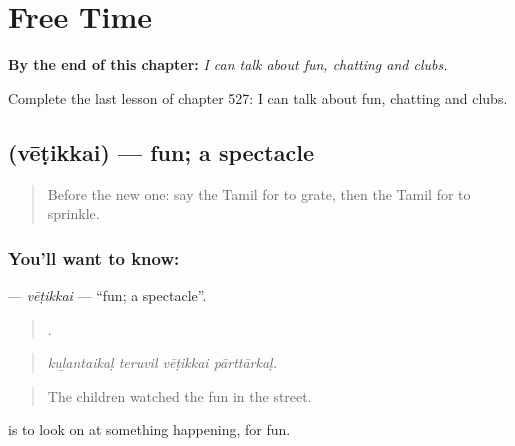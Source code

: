 
\chapter{Free Time}
\label{ch:ta-free-time}

\begin{chapteropening}
\textbf{By the end of this chapter:} \emph{I can talk about fun, chatting and clubs.}

Complete the last lesson of chapter 527: I can talk about fun, chatting and clubs.
\end{chapteropening}

\section[\texorpdfstring{\ta{வேடிக்கை} (vēṭikkai)}{வேடிக்கை (vēṭikkai)}]{ (vēṭikkai) — fun; a spectacle}

\label{lesson:TA-C527-vetikkai}



\begin{quote}
Before the new one: say the Tamil for to grate, then the Tamil for to sprinkle.
\end{quote}

\subsection*{You'll want to know: }
\textbf{} — \emph{vēṭikkai} — \textquotedblleft{}fun; a spectacle\textquotedblright{}.

\begin{quote}
   .
\end{quote}

\begin{quote}
\emph{kuḻantaikaḷ teruvil vēṭikkai pārttārkaḷ.}
\end{quote}

\begin{quote}
The children watched the fun in the street.
\end{quote}

  is to look on at something happening, for fun.

